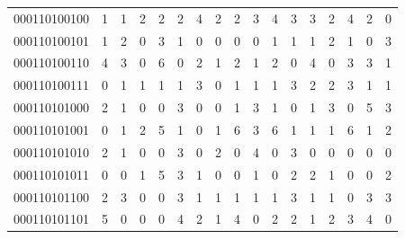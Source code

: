 \documentclass[10pt,a4paper]{article}
\begin{document}
\begin{longtable}{ |c|c|c|c|c|c|c|c|c|c|c|c|c|c|c|c|c| }
    000110100100              & 1                            & 1                                & 2                            & 2                              & 2   & 4   & 2   & 2   & 3   & 4   & 3   & 3   & 2   & 4   & 2   & 0   \\
    000110100101              & 1                            & 2                                & 0                            & 3                              & 1   & 0   & 0   & 0   & 0   & 1   & 1   & 1   & 2   & 1   & 0   & 3   \\
    000110100110              & 4                            & 3                                & 0                            & 6                              & 0   & 2   & 1   & 2   & 1   & 2   & 0   & 4   & 0   & 3   & 3   & 1   \\
    000110100111              & 0                            & 1                                & 1                            & 1                              & 1   & 3   & 0   & 1   & 1   & 1   & 3   & 2   & 2   & 3   & 1   & 1   \\
    000110101000              & 2                            & 1                                & 0                            & 0                              & 3   & 0   & 0   & 1   & 3   & 1   & 0   & 1   & 3   & 0   & 5   & 3   \\
    000110101001              & 0                            & 1                                & 2                            & 5                              & 1   & 0   & 1   & 6   & 3   & 6   & 1   & 1   & 1   & 6   & 1   & 2   \\
    000110101010              & 2                            & 1                                & 0                            & 0                              & 3   & 0   & 2   & 0   & 4   & 0   & 3   & 0   & 0   & 0   & 0   & 0   \\
    000110101011              & 0                            & 0                                & 1                            & 5                              & 3   & 1   & 0   & 0   & 1   & 0   & 2   & 2   & 1   & 0   & 0   & 2   \\
    000110101100              & 2                            & 3                                & 0                            & 0                              & 3   & 1   & 1   & 1   & 1   & 1   & 3   & 1   & 1   & 0   & 3   & 3   \\
    000110101101              & 5                            & 0                                & 0                            & 0                              & 4   & 2   & 1   & 4   & 0   & 2   & 2   & 1   & 2   & 3   & 4   & 0   \\

\end{longtable}
\end{document}
